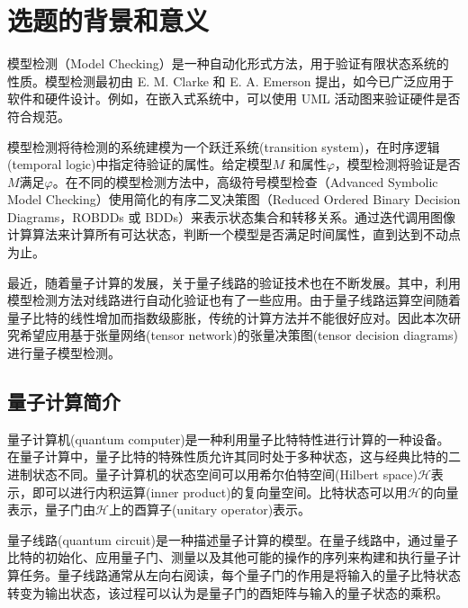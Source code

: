 \section{选题的背景和意义}

模型检测（Model Checking）是一种自动化形式方法，用于验证有限状态系统的性质。模型检测最初由 E. M. Clarke 和 E. A. Emerson 提出\citep{Emerson_1980,Clarke,Clarke_1986}，如今已广泛应用于软件和硬件设计。例如，在嵌入式系统中，可以使用 UML 活动图来验证硬件是否符合规范\citep{Grobelna_2015}。

模型检测将待检测的系统建模为一个跃迁系统(transition system)，在时序逻辑(temporal logic)中指定待验证的属性。给定模型\(M\) 和属性\(\varphi\)，模型检测将验证是否\(M\)满足\(\varphi\)。在不同的模型检测方法中，高级符号模型检查（Advanced Symbolic Model Checking）\citep{Grobelna_2015}使用简化的有序二叉决策图（Reduced Ordered Binary Decision Diagrams，ROBDDs 或 BDDs）\citep{Bryant_1986}来表示状态集合和转移关系。通过迭代调用图像计算算法来计算所有可达状态，判断一个模型是否满足时间属性，直到达到不动点为止。

最近，随着量子计算的发展，关于量子线路的验证技术也在不断发展\citep{viamontes2007checking,burgholzer2020advanced}。其中，利用模型检测方法对线路进行自动化验证也有了一些应用。由于量子线路运算空间随着量子比特的线性增加而指数级膨胀，传统的计算方法并不能很好应对。因此本次研究希望应用基于张量网络(tensor network)的张量决策图(tensor decision diagrams)进行量子模型检测。 
\subsection{量子计算简介}
量子计算机(quantum computer)是一种利用量子比特特性进行计算的一种设备。在量子计算中，量子比特的特殊性质允许其同时处于多种状态，这与经典比特的二进制状态不同。量子计算机的状态空间可以用希尔伯特空间(Hilbert space)\(\mathcal{H}\)表示\citep{nielsen2010quantum}，即可以进行内积运算(inner product)的复向量空间。比特状态可以用\(\mathcal{H}\)的向量表示，量子门由\(\mathcal{H}\)上的酉算子(unitary operator)表示。

量子线路(quantum circuit)是一种描述量子计算的模型。在量子线路中，通过量子比特的初始化、应用量子门、测量以及其他可能的操作的序列来构建和执行量子计算任务。量子线路通常从左向右阅读，每个量子门的作用是将输入的量子比特状态转变为输出状态，该过程可以认为是量子门的酉矩阵与输入的量子状态的乘积。

